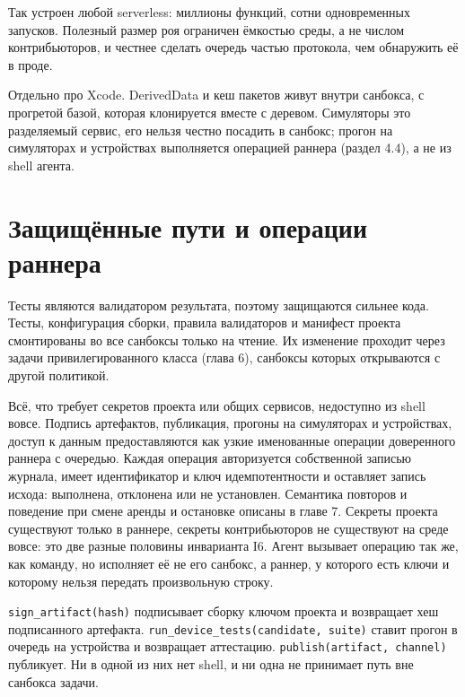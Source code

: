 \begin{whybox}
Так устроен любой serverless: миллионы функций, сотни одновременных запусков. Полезный размер роя ограничен ёмкостью среды, а не числом контрибьюторов, и честнее сделать очередь частью протокола, чем обнаружить её в проде.
\end{whybox}

Отдельно про Xcode. DerivedData и кеш пакетов живут внутри санбокса, с прогретой базой, которая клонируется вместе с деревом. Симуляторы это разделяемый сервис, его нельзя честно посадить в санбокс; прогон на симуляторах и устройствах выполняется операцией раннера (раздел 4.4), а не из shell агента.

\section{Защищённые пути и операции раннера}

Тесты являются валидатором результата, поэтому защищаются сильнее кода. Тесты, конфигурация сборки, правила валидаторов и манифест проекта смонтированы во все санбоксы только на чтение. Их изменение проходит через задачи привилегированного класса (глава 6), санбоксы которых открываются с другой политикой.

Всё, что требует секретов проекта или общих сервисов, недоступно из shell вовсе. Подпись артефактов, публикация, прогоны на симуляторах и устройствах, доступ к данным предоставляются как узкие именованные операции доверенного раннера с очередью. Каждая операция авторизуется собственной записью журнала, имеет идентификатор и ключ идемпотентности и оставляет запись исхода: выполнена, отклонена или не установлен. Семантика повторов и поведение при смене аренды и остановке описаны в главе 7. Секреты проекта существуют только в раннере, секреты контрибьюторов не существуют на среде вовсе: это две разные половины инварианта I6. Агент вызывает операцию так же, как команду, но исполняет её не его санбокс, а раннер, у которого есть ключи и которому нельзя передать произвольную строку.

\begin{exbox}
\texttt{sign\_artifact(hash)} подписывает сборку ключом проекта и возвращает хеш подписанного артефакта. \texttt{run\_device\_tests(candidate, suite)} ставит прогон в очередь на устройства и возвращает аттестацию. \texttt{publish(artifact, channel)} публикует. Ни в одной из них нет shell, и ни одна не принимает путь вне санбокса задачи.
\end{exbox}

